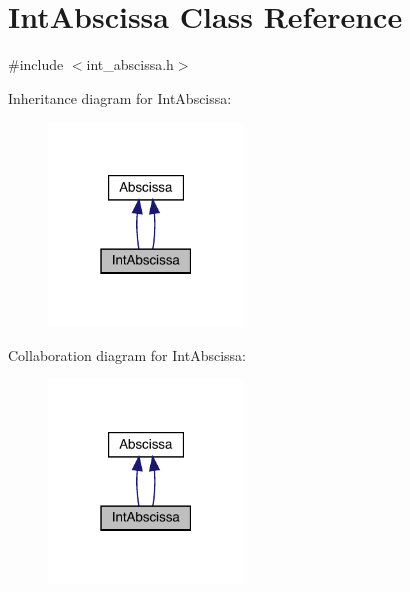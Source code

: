 \hypertarget{classIntAbscissa}{}\section{Int\+Abscissa Class Reference}
\label{classIntAbscissa}


{\ttfamily \#include $<$int\+\_\+abscissa.\+h$>$}



Inheritance diagram for Int\+Abscissa\+:
\nopagebreak
\begin{figure}[H]
\begin{center}
\leavevmode
\includegraphics[width=147pt]{d6/d94/classIntAbscissa__inherit__graph}
\end{center}
\end{figure}


Collaboration diagram for Int\+Abscissa\+:
\nopagebreak
\begin{figure}[H]
\begin{center}
\leavevmode
\includegraphics[width=147pt]{d4/d8b/classIntAbscissa__coll__graph}
\end{center}
\end{figure}
